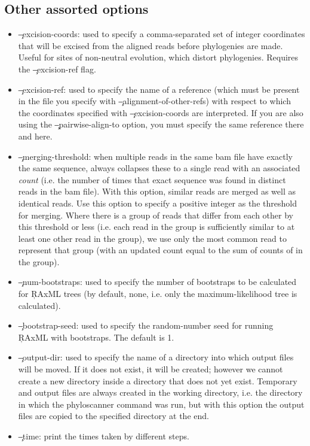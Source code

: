 \subsection{Other assorted options}
\begin{itemize}
\item \c{--excision-coords}: used to specify a comma-separated set of integer coordinates that will be excised from the aligned reads before phylogenies are made.
Useful for sites of non-neutral evolution, which distort phylogenies.
Requires the \c{--excision-ref} flag.
\item \c{--excision-ref}: used to specify the name of a reference (which must be present in the file you specify with \c{--alignment-of-other-refs}) with respect to which the coordinates specified with \c{--excision-coords} are interpreted.
If you are also using the \c{--pairwise-align-to} option, you must specify the same reference there
and here.
\item \c{--merging-threshold}: when multiple reads in the same bam file have exactly the same sequence, \p always collapses these to a single read with an associated {\it count} (i.e. the number of times that exact sequence was found in distinct reads in the bam file).
With this option, similar reads are merged as well as identical reads.
Use this option to specify a positive integer as the threshold for merging.
Where there is a group of reads that differ from each other by this threshold or less (i.e. each read in the group is sufficiently similar to at least one other read in the group), we use only the most common read to represent that group (with an updated count equal to the sum of counts of in the group).
\item \c{--num-bootstraps}: used to specify the number of bootstraps to be calculated for \c{RAxML} trees (by default, none, i.e. only the maximum-likelihood tree is calculated).
\item \c{--bootstrap-seed}: used to specify the random-number seed for running \c{RAxML} with bootstraps.
The default is 1.
\item \c{--output-dir}: used to specify the name of a directory into which output files will be moved.
If it does not exist, it will be created; however we cannot create a new directory inside a directory that does not yet exist.
Temporary and output files are always created in the working directory, i.e. the directory in which the phyloscanner command was run, but with this option the output files are copied to the specified directory at the end.
\item \c{--time}: print the times taken by different steps.

\end{itemize}
